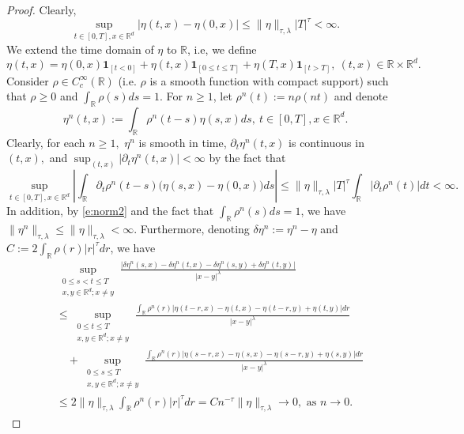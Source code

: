 \documentclass[11pt,reqno]{amsart}
\def\R{\mathbb R}
\numberwithin{equation}{section}
\begin{document}
\begin{proof}
Clearly, 
\begin{equation*}
\sup_{t\in[0,T],x\in\mathbb{R}^{d}}|\eta(t,x) - \eta(0,x)|\le \|\eta\|_{\tau,\lambda}|T|^{\tau}<\infty.
\end{equation*} 
We extend the time domain of $\eta$ to $\R$, i.e, we define
\begin{equation*}
\eta(t,x) = \eta(0,x) \mathbf 1_{[t<0]} + \eta(t,x) \mathbf 1_{[0\le t\le T]} + \eta(T,x)\mathbf 1_{[t>T]},\  (t,x)\in\R\times \R^d.
\end{equation*}
Consider $\rho\in C^{\infty}_{c}(\mathbb{R})$ (i.e. $\rho$ is a smooth function with  compact support) such that $\rho \ge 0$ and $\int_{\mathbb{R}}\rho(s)ds = 1$. For $n\ge 1$, let $\rho^{n}(t) := n\rho(nt)$ and denote
\begin{equation*}
\eta^{n}(t,x) := \int_{\mathbb{R}}\rho^{n}(t-s)\eta(s,x)ds,\ t\in[0,T],x\in\mathbb{R}^{d}.
\end{equation*}
Clearly, for each 
$n\ge 1,$ $\eta^{n}$ is smooth in time, $\partial_{t}\eta^{n}(t,x)$ is continuous in $(t,x),$ and $\sup_{(t,x)}|\partial_{t}\eta^{n}(t,x)|<\infty$ by the fact that
\begin{equation*}
\sup_{t\in[0,T],x\in\R^{d}}\left|\int_{\R}\partial_{t}\rho^{n}(t-s)\Big(\eta(s,x) - \eta(0,x)\Big) ds \right|\le \|\eta\|_{\tau,\lambda}|T|^{\tau}\int_{\R}|\partial_{t}\rho^{n}(t)|dt < \infty.
\end{equation*}
In addition, by \eqref{e:norm2} and the fact that $\int_\R\rho^n(s) ds=1$, we have $\|\eta^{n}\|_{\tau,\lambda}\le \|\eta \|_{\tau,\lambda}<\infty. $ 
Furthermore, denoting $\delta \eta^{n}:=\eta^{n} - \eta$ and $C := 2\int_{\R}\rho(r)\left|r\right|^{\tau}dr$, we have 
\begin{equation}\label{e:smooth appro}
\begin{aligned}
&\sup _{\substack{0 \leq s<t \leq T \\ x, y \in \mathbb{R}^{d} ; x \neq y}} \frac{|\delta \eta^{n}(s, x)-\delta \eta^{n}(t, x)-\delta\eta^{n}(s, y)+\delta \eta^{n}(t, y)|}{|x - y|^{\lambda}}\\
& \le \sup _{\substack{0 \leq t \leq T \\ x, y \in \mathbb{R}^{d} ; x \neq y}} \frac{\int_{\R}\rho^{n}(r)\left|\eta(t-r,x) - \eta(t,x) - \eta(t-r,y) + \eta(t,y)\right|dr}{|x - y|^{\lambda}}\\
&\quad + \sup _{\substack{0 \leq s \leq T \\ x, y \in \mathbb{R}^{d} ; x \neq y}} \frac{\int_{\R}\rho^{n}(r)\left|\eta(s-r,x) - \eta(s,x) - \eta(s-r,y) + \eta(s,y)\right|dr}{|x - y|^{\lambda}}\\
&\le 2\|\eta\|_{\tau,\lambda}\int_{\R}\rho^{n}(r)|r|^{\tau} dr = C n^{-\tau} \|\eta\|_{\tau,\lambda} \rightarrow
 0,\text{ as }n\rightarrow 0.
\end{aligned}
\end{equation}





\end{proof}
\end{document}
